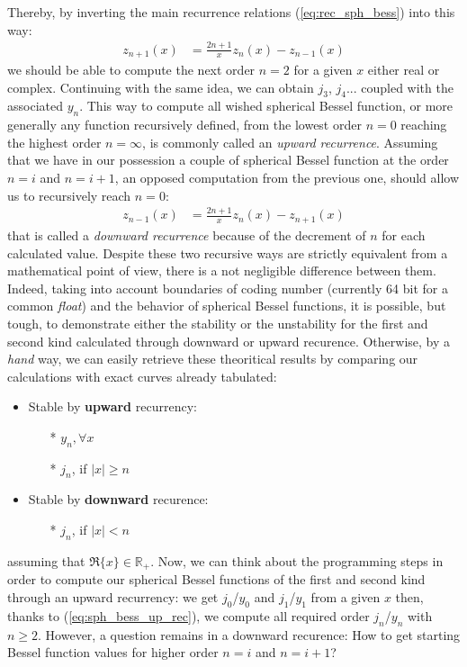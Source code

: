 \documentclass{article}
\numberwithin{equation}{section}
\begin{document}
Thereby, by inverting the main recurrence relations (\ref{eq:rec_sph_bess}) into this way:
\begin{align}\label{eq:sph_bess_up_rec}
z_{n+1}(x) &= \frac{2n+1}{x}z_{n}(x) - z_{n-1}(x)
\end{align}
we should be able to compute the next order $n=2$ for a given $x$ either real or complex. Continuing with the same idea, we can obtain $j_{3}$, $j_{4}$... coupled with the associated $y_{n}$. This way to compute all wished spherical Bessel function, or more generally any function recursively defined, from the lowest order $n=0$ reaching the highest order $n=\infty$, is commonly called an \textit{upward recurrence}. Assuming that we have in our possession a couple of spherical Bessel function at the order $n=i$ and $n=i+1$, an opposed computation from the previous one, should allow us to recursively reach $n=0$: 
\begin{align}\label{eq:sph_bess_down_rec}
z_{n-1}(x) &= \frac{2n+1}{x}z_{n}(x) - z_{n+1}(x)
\end{align}
that is called a \textit{downward recurrence} because of the decrement of $n$ for each calculated value. Despite these two recursive ways are strictly equivalent from a mathematical point of view, there is a not negligible difference between them. Indeed, taking into account boundaries of coding number (currently 64 bit for a common \textit{float}) and the behavior of spherical Bessel functions, it is possible, but tough, to demonstrate either the stability or the unstability for the first and second kind calculated through downward or upward recurence. Otherwise, by a \textit{hand} way, we can easily retrieve these theoritical results by comparing our calculations with exact curves already tabulated:
\begin{itemize}
\item Stable by \textbf{upward} recurrency: 
\begin{itemize}
\item[*]$y_{n}, \forall x$
\item[*]$j_{n}$, if $|x| \geqslant n$
\end{itemize}
\item Stable by \textbf{downward} recurence:
\begin{itemize}
\item[*]$j_{n}$, if $|x| < n$
\end{itemize}
\end{itemize}
assuming that $\Re\{x\} \in\mathbb{R}_{+}$. Now, we can think about the programming steps in order to compute our spherical Bessel functions of the first and second kind through an upward recurrency: we get $j_{0}$/$y_{0}$ and $j_{1}$/$y_{1}$ from a given $x$ then, thanks to (\ref{eq:sph_bess_up_rec}), we compute all required order $j_{n}$/$y_{n}$ with $n \geqslant 2$. However, a question remains in a downward recurence: How to get starting Bessel function values for higher order $n=i$ and $n=i+1$?
\end{document}
